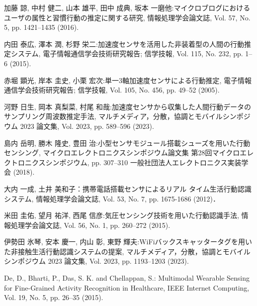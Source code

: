 \thispagestyle{myheadings}
    
\begin{thebibliography}{参考文献}

	加藤 諒, 中村 健二, 山本 雄平, 田中 成典, 坂本 一磨他:マイクロブログにおけるユーザの属性と習慣行動の推定に関する研究, 情報処理学会論文誌, Vol. 57, No. 5, pp. 1421–1435 (2016).

	内田 泰広, 澤本 潤, 杉野 栄二:加速度センサを活用した非装着型の人間の行動推定システム, 電子情報通信学会技術研究報告; 信学技報, Vol. 115, No. 232, pp. 1–6 (2015).

	赤堀 顕光, 岸本 圭史, 小栗 宏次:単一3軸加速度センサによる行動推定, 電子情報通信学会技術研究報告; 信学技報, Vol. 105, No. 456, pp. 49–52 (2005).

	河野 日生, 岡本 真梨菜, 村尾 和哉:加速度センサから収集した人間行動データのサンプリング周波数推定手法, マルチメディア，分散，協調とモバイルシンポジウム 2023 論文集, Vol. 2023, pp. 589–596 (2023).

	島内 岳明, 勝木 隆史, 豊田 治:小型センサモジュール搭載シューズを用いた行動センシング, マイクロエレクトロニクスシンポジウム論文集 第28回マイクロエレクトロニクスシンポジウム, pp. 307–310 一般社団法人エレクトロニクス実装学会 (2018).

	大内 一成, 土井 美和子：携帯電話搭載センサによるリアル
	タイム生活行動認識システム, 情報処理学会論文誌, Vol. 53,
	No. 7, pp. 1675-1686 (2012)．

	米田 圭佑, 望月 祐洋, 西尾 信彦:気圧センシング技術を用いた行動認識手法, 情報処理学会論文誌, Vol. 56, No. 1, pp. 260–272 (2015).

	伊勢田 氷琴, 安本 慶一, 内山 彰, 東野 輝夫:WiFiバックスキャッタータグを用いた非接触生活行動認識システムの提案, マルチメディア，分散，協調とモバイルシンポジウム 2023 論文集, Vol. 2023, pp. 1193–1203 (2023).

	De, D., Bharti, P., Das, S. K. and Chellappan, S.: Multimodal Wearable Sensing for Fine-Grained Activity Recognition in Healthcare, IEEE Internet Computing, Vol. 19, No. 5, pp. 26–35 (2015).


\end{thebibliography}
